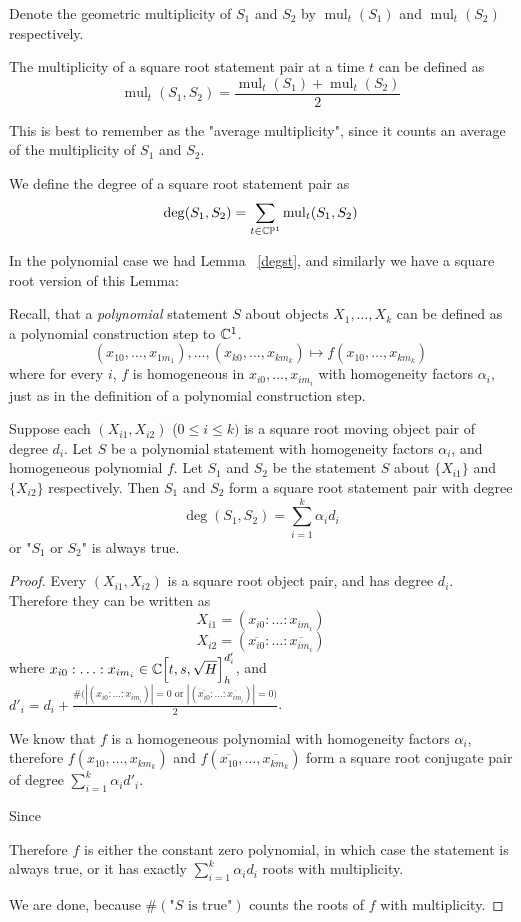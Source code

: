\documentclass[a4paper]{article}
\begin{document}
Denote the geometric multiplicity of $S_1$ and $S_2$ by $\operatorname{mul}_t(S_1)$ and $\operatorname{mul}_t(S_2)$ respectively.

The multiplicity of a square root statement pair at a time $t$ can be defined as
$$\operatorname{mul}_t(S_1,S_2)=\frac{\operatorname{mul}_t(S_1)+\operatorname{mul}_t(S_2)}{2}$$

This is best to remember as the "average multiplicity", since it counts an average of the multiplicity of $S_1$ and $S_2$.

We define the degree of a square root statement pair as $$\deg (S_1,S_2)=\sum_{t\in\mathbb{C}\mathbb{P}^1} \operatorname{mul}_t(S_1,S_2)$$

In the polynomial case we had Lemma ~\ref{degst}, and similarly we have a square root version of this Lemma:

Recall, that a \textit{polynomial} statement $S$ about objects $X_1,\ldots, X_k$ can be defined as a polynomial construction step to $\mathbb{C}^1$.
$$(x_{10},\ldots,x_{1m_1}),\ldots,(x_{k0},\ldots,x_{km_k})\mapsto f(x_{10},\ldots ,x_{km_k})$$
where for every $i$, $f$ is homogeneous in $x_{i0},\ldots,x_{im_i}$ with homogeneity factors $\alpha_i$, just as in the definition of a polynomial construction step.

\begin{lemma}
    Suppose each $(X_{i1}, X_{i2})$ ($0\le i\le k)$ is a square root moving object pair of degree $d_i$. Let $S$ be a polynomial statement with homogeneity factors $\alpha_i$, and homogeneous polynomial $f$. Let $S_1$ and $S_2$ be the statement $S$ about $\{X_{i1}\}$ and $\{X_{i2}\}$ respectively. Then $S_1$ and $S_2$ form a square root statement pair with degree
    $$\deg (S_1,S_2)=\sum_{i=1}^k \alpha_id_i$$
    or "$S_1$ or $S_2$" is always true.
\end{lemma}
\begin{proof}
    Every $(X_{i1}, X_{i2})$ is a square root object pair, and has degree $d_i$. Therefore they can be written as $$X_{i1}=(x_{i0}:\ldots:x_{im_i})$$
    $$X_{i2}=(\overline{x_{i0}}:\ldots:\overline{x_{im_i}})$$
    where $x_{i0}:\ldots:x_{im_i} \in \mathbb{C}\Bigl[t,s,\sqrt{H}\Bigr]_h^{d'_i}$, and $d'_i=d_i+\frac{\#\bigl(|(x_{i0}:\ldots:x_{im_i})|=0\text{ or } |(\overline{x_{i0}}:\ldots:\overline{x_{im_i}})|=0\bigr)}{2}$.



    We know that $f$ is a homogeneous polynomial with homogeneity factors $\alpha_i$, therefore $f(x_{10},\ldots,x_{km_k})$ and $f(\overline{x_{10}},\ldots,\overline{x_{km_k}})$ form a square root conjugate pair of degree $\sum_{i=1}^k \alpha_id'_i$.

    Since

    Therefore $f$ is either the constant zero polynomial, in which case the statement is always true, or it has exactly $\sum_{i=1}^k \alpha_id_i$ roots with multiplicity.

    We are done, because $\#(\text{"$S$ is true"})$ counts the roots of $f$ with multiplicity.
\end{proof}
\end{document}
